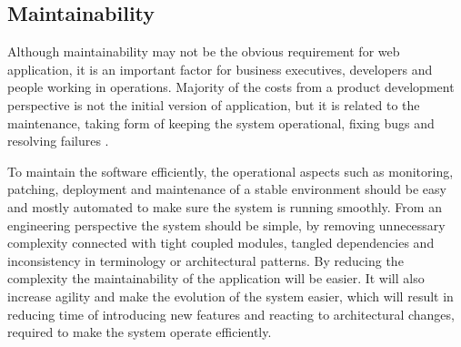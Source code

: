 \subsection{Maintainability}

Although maintainability may not be the obvious requirement for web application, it is an important factor for business executives, developers and people working in operations. Majority of the costs from a product development perspective is not the initial version of application, but it is related to the maintenance, taking form of keeping the system operational, fixing bugs and resolving failures \cite{DesignDataIntensiveApplications}.

To maintain the software efficiently, the operational aspects such as monitoring, patching, deployment and maintenance of a stable environment should be easy and mostly automated to make sure the system is running smoothly. From an engineering perspective the system should be simple, by removing unnecessary complexity connected with tight coupled modules, tangled dependencies and inconsistency in terminology or architectural patterns. By reducing the complexity the maintainability of the application will be easier. It will also increase agility and make the evolution of the system easier, which will result in reducing time of introducing new features and reacting to architectural changes, required to make the system operate efficiently.




